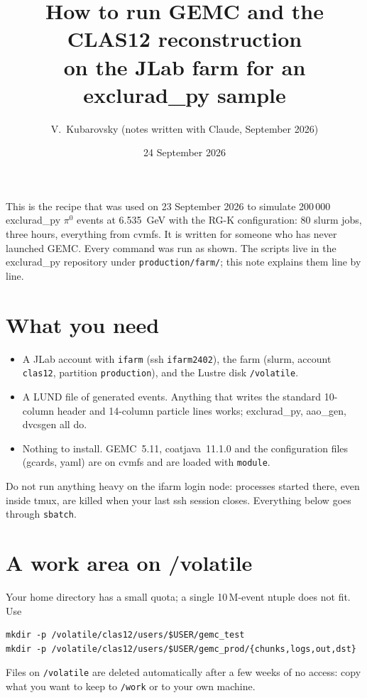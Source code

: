\documentclass[11pt]{article}
\title{How to run GEMC and the CLAS12 reconstruction\\on the JLab farm for an exclurad\_py sample}
\author{V.~Kubarovsky (notes written with Claude, September 2026)}
\date{24 September 2026}
\begin{document}
\maketitle

\noindent This is the recipe that was used on 23 September 2026 to simulate 200\,000 exclurad\_py
$\pi^0$ events at 6.535~GeV with the RG-K configuration: 80 slurm jobs, three hours, everything
from cvmfs. It is written for someone who has never launched GEMC. Every command was run as
shown. The scripts live in the exclurad\_py repository under \texttt{production/farm/}; this note
explains them line by line.

\section{What you need}
\begin{itemize}
\item A JLab account with \texttt{ifarm} (ssh \texttt{ifarm2402}), the farm (slurm, account
  \texttt{clas12}, partition \texttt{production}), and the Lustre disk \texttt{/volatile}.
\item A LUND file of generated events. Anything that writes the standard 10-column header and
  14-column particle lines works; exclurad\_py, aao\_gen, dvcsgen all do.
\item Nothing to install. GEMC~5.11, coatjava~11.1.0 and the configuration files (gcards, yaml) are
  on cvmfs and are loaded with \texttt{module}.
\end{itemize}
Do not run anything heavy on the ifarm login node: processes started there, even inside tmux,
are killed when your last ssh session closes. Everything below goes through \texttt{sbatch}.

\section{A work area on /volatile}
Your home directory has a small quota; a single 10\,M-event ntuple does not fit. Use
\begin{lstlisting}
mkdir -p /volatile/clas12/users/$USER/gemc_test
mkdir -p /volatile/clas12/users/$USER/gemc_prod/{chunks,logs,out,dst}
\end{lstlisting}
Files on \texttt{/volatile} are deleted automatically after a few weeks of no access: copy what you
want to keep to \texttt{/work} or to your own machine.
\end{document}
